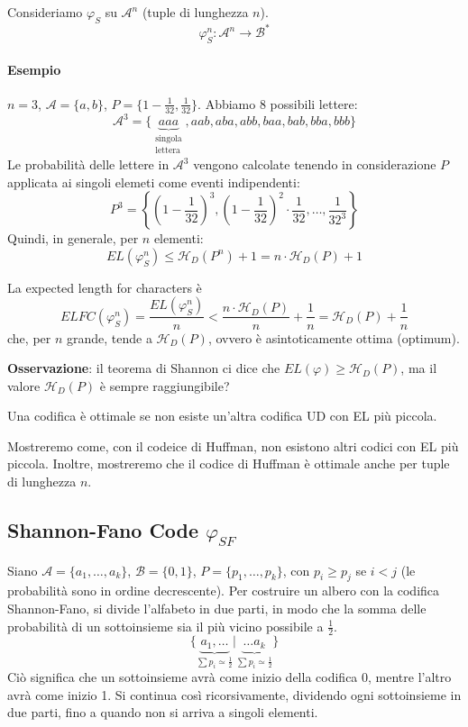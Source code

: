 Consideriamo $\varphi_S$ su $\mathcal{A}^n$ (tuple di lunghezza $n$).
$$
    \varphi_S^n : \mathcal{A}^n \to \mathcal{B}^*
$$
\paragraph{Esempio} $n=3$, $\mathcal{A}=\{a,b\}$, $P=\{1-\frac{1}{32},\frac{1}{32}\}$. Abbiamo 8 possibili lettere:
$$
    \mathcal{A}^3 = \{\underbrace{aaa}_{\substack{\text{singola}\\\text{lettera}}},aab,aba,abb,baa,bab,bba,bbb\}
$$
Le probabilità delle lettere in $\mathcal{A}^3$ vengono calcolate tenendo in considerazione $P$ applicata ai singoli elemeti come eventi indipendenti:
$$
    P^3 = \left\{ \left(1-\frac{1}{32}\right)^3, \left(1-\frac{1}{32}\right)^2\cdot\frac{1}{32}, \dots, \frac{1}{32^3} \right\}
$$
Quindi, in generale, per $n$ elementi:
$$
    EL(\varphi_S^n) \leq \mathcal{H}_D(P^n) + 1 = n\cdot\mathcal{H}_D(P) + 1
$$

\begin{definition}
    La expected length for characters è 
    $$
        ELFC(\varphi_S^n) = \frac{EL(\varphi_S^n)}{n} < \frac{n\cdot\mathcal{H}_D(P)}{n} + \frac{1}{n} = \mathcal{H}_D(P) + \frac{1}{n}
    $$
    che, per $n$ grande, tende a $\mathcal{H}_D(P)$, ovvero è asintoticamente ottima (optimum).
\end{definition}
\textbf{Osservazione}: il teorema di Shannon ci dice che $EL(\varphi)\geq\mathcal{H}_D(P)$, ma il valore $\mathcal{H}_D(P)$ è sempre raggiungibile?

\begin{definition}
    Una codifica è ottimale se non esiste un'altra codifica UD con EL più piccola.
\end{definition}
Mostreremo come, con il codeice di Huffman, non esistono altri codici con EL più piccola. Inoltre, mostreremo che il codice di Huffman è ottimale anche per tuple di lunghezza $n$.


\subsection{Shannon-Fano Code $\varphi_{SF}$}
Siano $\mathcal{A}=\{a_1,\dots,a_k\}$, $\mathcal{B}=\{0,1\}$, $P=\{p_1,\dots,p_k\}$, con $p_i\geq p_j$ se $i<j$ (le probabilità sono in ordine decrescente). Per costruire un albero con la codifica Shannon-Fano, si divide l'alfabeto in due parti, in modo che la somma delle probabilità di un sottoinsieme sia il più vicino possibile a $\frac{1}{2}$.
$$
    \{ \underbrace{a_1, \dots}_{\sum p_i\simeq \frac{1}{2}} | \underbrace{\dots a_k}_{\sum p_i\simeq \frac{1}{2}} \}
$$
Ciò significa che un sottoinsieme avrà come inizio della codifica 0, mentre l'altro avrà come inizio 1. Si continua così ricorsivamente, dividendo ogni sottoinsieme in due parti, fino a quando non si arriva a singoli elementi. 


